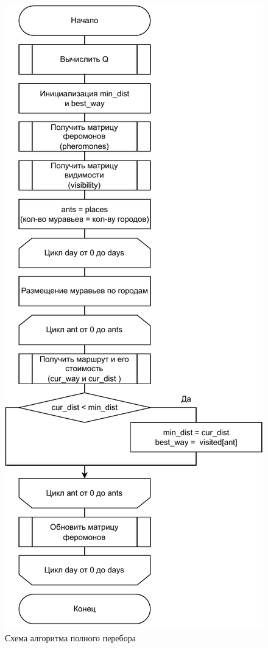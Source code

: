 \begin{figure}[h]
	\centering
	\includegraphics[height=0.9\textheight]{svg/ants}
	\caption{Схема алгоритма полного перебора}
	\label{fig:ants}
\end{figure}

